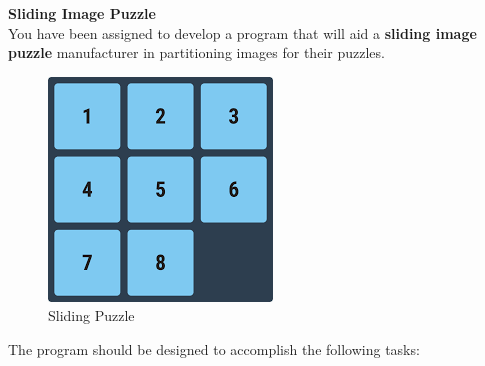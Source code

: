 
\question
{\center \bf Sliding Image Puzzle\\}
You have been assigned to develop a program that will aid a {\bf sliding
image puzzle} manufacturer in partitioning images for their puzzles.

\begin{figure}[H]
\centering
\includegraphics[scale=.5]{sliding_puzzle.png}
\caption{Sliding Puzzle}
\end{figure}

The program should be designed to accomplish the following tasks:

